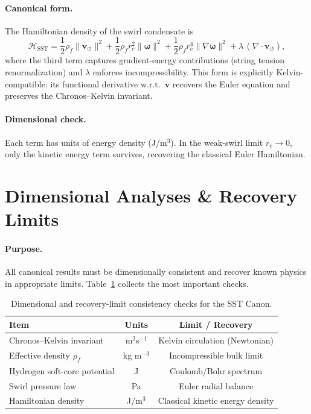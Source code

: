 \documentclass[10pt,reprint,aps,onecolumn,nofootinbib]{revtex4-2}
\begin{document}
    \paragraph{Canonical form.}
        The Hamiltonian density of the swirl condensate is
        \[
            \mathcal{H}_{\mathrm{SST}} =
            \frac{1}{2} \rho_{\!f} \lVert \mathbf{v}_{\!\boldsymbol{\circlearrowleft}}\rVert^2
            + \frac{1}{2} \rho_{\!f} r_c^{2} \lVert \boldsymbol{\omega} \rVert^{2}
            + \frac{1}{2} \rho_{\!f} r_c^{4} \lVert \nabla \boldsymbol{\omega} \rVert^{2}
            + \lambda\,(\nabla \cdot \mathbf{v}_{\!\boldsymbol{\circlearrowleft}}),
        \]
        where the third term captures gradient-energy contributions (string tension renormalization)
        and $\lambda$ enforces incompressibility. This form is explicitly Kelvin-compatible:
        its functional derivative w.r.t.\ $\mathbf{v}$ recovers the Euler equation and preserves
        the Chronos–Kelvin invariant.

    \paragraph{Dimensional check.}
        Each term has units of energy density (J/m$^3$). In the weak-swirl limit $r_c \to 0$,
        only the kinetic energy term survives, recovering the classical Euler Hamiltonian.

    \section{Dimensional Analyses \& Recovery Limits}
    \label{canon58:appB}
    \paragraph{Purpose.}
        All canonical results must be dimensionally consistent and recover
        known physics in appropriate limits. Table~\ref{canon58:dim-checks}
        collects the most important checks.
        \begin{table}[h!]
        \centering
        \begin{tabular}{|l|c|c|}
        \hline
        \textbf{Item} & \textbf{Units} & \textbf{Limit / Recovery} \\
        \hline
        Chronos--Kelvin invariant & m$^{2}$s$^{-1}$ & Kelvin circulation (Newtonian) \\
        Effective density $\rho_{\!f}$ & kg m$^{-3}$ & Incompressible bulk limit \\
        Hydrogen soft-core potential & J & Coulomb/Bohr spectrum \\
        Swirl pressure law & Pa & Euler radial balance \\
        Hamiltonian density & J/m$^{3}$ & Classical kinetic energy density \\
        \hline
        \end{tabular}
        \caption{Dimensional and recovery-limit consistency checks for the SST Canon.}
        \label{canon58:dim-checks}
        \end{table}
\end{document}
